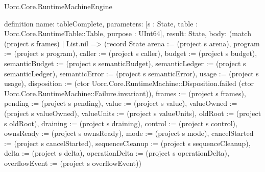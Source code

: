 \begin{lexlean}{Uorc.Core.RuntimeMachineEngine}
\begin{semanticmodule}
definition{
  name: tableComplete,
  parameters: [s : State, table : Uorc.Core.RuntimeTable::Table, purpose : UInt64],
  result: State,
  body: (match (project s frames)
    | List.nil => (record State {arena := (project s arena), program := (project s program), caller := (project s caller), budget := (project s budget), semanticBudget := (project s semanticBudget), semanticLedger := (project s semanticLedger), semanticError := (project s semanticError), usage := (project s usage), disposition := (ctor Uorc.Core.RuntimeMachine::Disposition.failed (ctor Uorc.Core.RuntimeMachine::Failure.invariant)), frames := (project s frames), pending := (project s pending), value := (project s value), valueOwned := (project s valueOwned), valueUnits := (project s valueUnits), oldRoot := (project s oldRoot), draining := (project s draining), control := (project s control), ownsReady := (project s ownsReady), mode := (project s mode), cancelStarted := (project s cancelStarted), sequenceCleanup := (project s sequenceCleanup), delta := (project s delta), operationDelta := (project s operationDelta), overflowEvent := (project s overflowEvent)})
}
\end{semanticmodule}
\end{lexlean}
